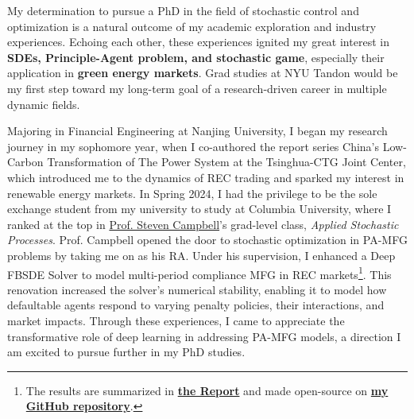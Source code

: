 \documentclass[12pt, a4paper]{article}
\newcommand{\Report}{\href{https://github.com/OrangeAoo/Multi-Compliance-MFG-FBSDEs/blob/ca6adb57636c1fc1ff9daea8d57f004e5762fd4d/FinalReports/Report-v3.pdf}{\textbf{the Report}}\xspace}
\newcommand{\GitHubMFG}{\href{https://github.com/OrangeAoo/Multi-Period-Compliance-MFG-FBSDEs}{\textbf{my GitHub repository}}\xspace}
\newcommand{\NJU}{Nanjing University\xspace}
\newcommand{\TCJC}{Tsinghua-CTG Joint Center\xspace}
\newcommand{\CU}{Columbia University\xspace}
\newcommand{\schoolShort}{NYU Tandon\xspace}
\newcommand{\SC}{\href{https://www.stevenacampbell.com/}{Prof. Steven Campbell}\xspace}
\begin{document}


My determination to pursue a PhD in the field of stochastic control and optimization is a natural outcome of my academic exploration and industry experiences. Echoing each other, these experiences ignited my great interest in \textbf{SDEs, Principle-Agent problem, and stochastic game}, especially their application in \textbf{green energy markets}. Grad studies at \schoolShort would be my first step toward my long-term goal of a research-driven career in multiple dynamic fields.

Majoring in Financial Engineering at \NJU, I began my research journey in my sophomore year, when I co-authored the report series China's Low-Carbon Transformation of The Power System at the \TCJC, which introduced me to the dynamics of REC trading and sparked my interest in renewable energy markets. In Spring 2024, I had the privilege to be the sole exchange student from my university to study at \CU, where I ranked at the top in \SC’s grad-level class, \textit{Applied Stochastic Processes}. Prof. Campbell opened the door to stochastic optimization in PA-MFG problems by taking me on as his RA. Under his supervision, I enhanced a Deep FBSDE Solver to model multi-period compliance MFG in REC markets\footnote{The results are summarized in \Report and made open-source on \GitHubMFG.}. This renovation increased the solver’s numerical stability, enabling it to model how defaultable agents respond to varying penalty policies, their interactions, and market impacts. Through these experiences, I came to appreciate the transformative role of deep learning in addressing PA-MFG models, a direction I am excited to pursue further in my PhD studies.
\end{document}

